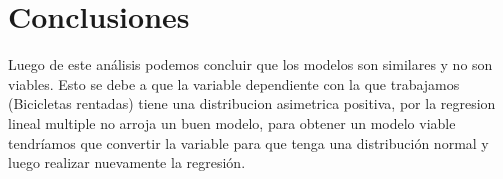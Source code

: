 \documentclass[]{elsarticle} %
\begin{document}
\newpage
\section{Conclusiones}

Luego de este análisis podemos concluir que los modelos son similares y
no son viables. Esto se debe a que la variable dependiente con la que
trabajamos (Bicicletas rentadas) tiene una distribucion asimetrica
positiva, por la regresion lineal multiple no arroja un buen modelo,
para obtener un modelo viable tendríamos que convertir la variable para
que tenga una distribución normal y luego realizar nuevamente la
regresión.
\end{document}
